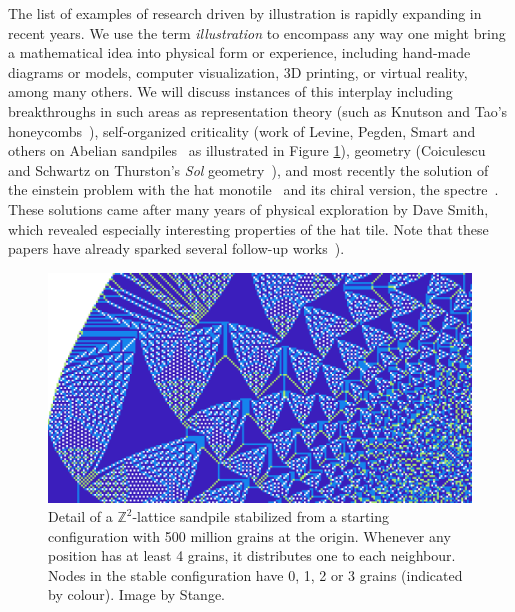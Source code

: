 \documentclass{notices}
\begin{document}
The list of examples of research driven by illustration is rapidly expanding in recent years. 
We use the term \emph{illustration} to encompass any way one might bring a mathematical idea into physical form or experience, including hand-made diagrams or models, computer visualization, 3D printing, or virtual reality, among many others. 
We will discuss instances of this interplay including breakthroughs in such areas as representation theory (such as Knutson and Tao's honeycombs~\cites{honeycombAMS,honeycomb1,honeycomb2}), self-organized criticality (work of Levine, Pegden, Smart and others on Abelian sandpiles~\cite{LPS17} as illustrated in Figure \ref{fig:sandpile}), geometry (Coiculescu and Schwartz on Thurston's \emph{Sol} geometry~\cite{coiculescu2022sol}), and most recently the solution of the einstein problem with the hat monotile~\cite{smith2023aperiodic} and its chiral version, the spectre~\cite{smith2023chiral}. 
These solutions came after many years of physical exploration by Dave Smith, which revealed especially interesting properties of the hat tile.
Note that these papers have already sparked several follow-up works~\cites{reitebuch2023direct,baake2023dynamics,socolar2023quasicrystalline}).

\begin{figure}
    \centering
    \includegraphics[width=0.95\linewidth]{images/close-sandpile.png}
    \caption{Detail of a $\mathbb{Z}^2$-lattice sandpile stabilized from a starting configuration with 500 million grains at the origin.  Whenever any position has at least 4 grains, it distributes one to each neighbour.  Nodes in the stable configuration have 0, 1, 2 or 3 grains (indicated by colour).  Image by Stange.}
    \label{fig:sandpile}
\end{figure}
\end{document}
